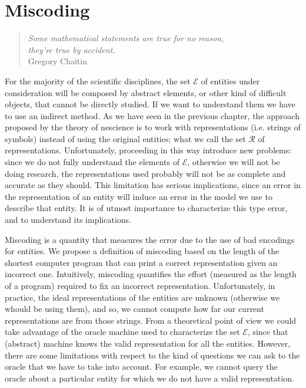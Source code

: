 %
%


\chapter{Miscoding}
\label{chap:Miscoding}

\begin{quote}
\begin{flushright}
\emph{Some mathematical statements are true for no reason,\\
they're true by accident.}\\
Gregory Chaitin
\end{flushright}
\end{quote}
\bigskip

For the majority of the scientific disciplines, the set $\mathcal{E}$ of entities under consideration will be composed by abstract elements, or other kind of difficult objects, that cannot be directly studied. If we want to understand them we have to use an indirect method. As we have seen in the previous chapter, the approach proposed by the theory of nescience is to work with representations (i.e. strings of symbols) instead of using the original entities; what we call the set $\mathcal{R}$ of representations. Unfortunately, proceeding in this way introduce new problems: since we do not fully understand the elements of $\mathcal{E}$, otherwise we will not be doing research, the representations used probably will not be as complete and accurate as they should. This limitation has serious implications, since an error in the representation of an entity will induce an error in the model we use to describe that entity. It is of utmost importance to characterize this type error, and to understand its implications.

Miscoding is a quantity that measures the error due to the use of bad encodings for entities. We propose a definition of miscoding based on the length of the shortest computer program that can print a correct representation given an incorrect one. Intuitively, miscoding quantifies the effort (measured as the length of a program) required to fix an incorrect representation. Unfortunately, in practice, the ideal representations of the entities are unknown (otherwise we whould be using them), and so, we cannot compute how far our current representations are from those strings. From a theoretical point of view we could take advantage of the oracle machine used to characterize the set $\mathcal{E}$, since that (abstract) machine knows the valid representation for all the entities. However, there are some limitations with respect to the kind of questions we can ask to the oracle that we have to take into account. For example, we cannot query the oracle about a particular entity for which we do not have a valid representation.

